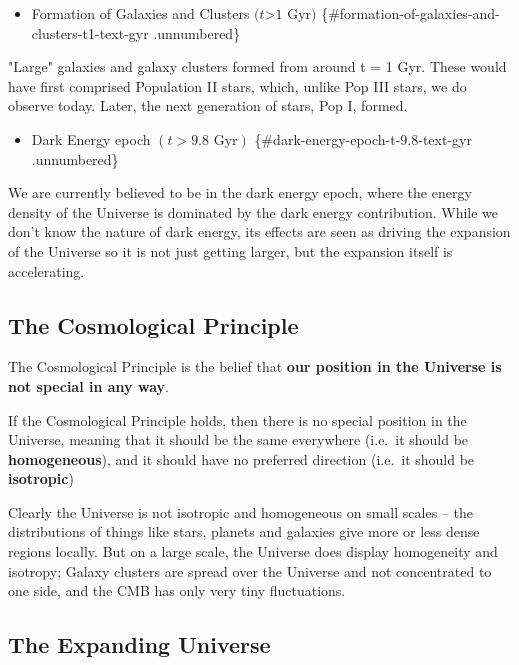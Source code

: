 \documentclass[11pt,a4paper,notoc]{tufte-handout}
\providecommand{\tightlist}{%
  \setlength{\itemsep}{0pt}\setlength{\parskip}{0pt}}
\begin{document}
\begin{itemize}
\tightlist
\item
  Formation of Galaxies and Clusters \((t\)\textgreater{}\(1 \text{ Gyr})\) \{\#formation-of-galaxies-and-clusters-t1-text-gyr .unnumbered\}
\end{itemize}

"Large" galaxies and galaxy clusters formed from around t = 1 Gyr.
These would have first comprised Population II stars, which, unlike Pop
III stars, we do observe today. Later, the next generation of stars, Pop
I, formed.

\begin{itemize}
\tightlist
\item
  Dark Energy epoch \((t > 9.8 \text{ Gyr})\) \{\#dark-energy-epoch-t-9.8-text-gyr .unnumbered\}
\end{itemize}

We are currently believed to be in the dark energy epoch, where the
energy density of the Universe is dominated by the dark energy
contribution. While we don't know the nature of dark energy, its effects
are seen as driving the expansion of the Universe so it is not just
getting larger, but the expansion itself is accelerating.

\hypertarget{sec:cosmoprinciple}{%
\subsection{The Cosmological Principle}\label{sec:cosmoprinciple}}

The Cosmological Principle is the belief that \textbf{our position in the
Universe is not special in any way}.

If the Cosmological Principle holds, then there is no special position
in the Universe, meaning that it should be the same everywhere (i.e.~it
should be \textbf{homogeneous}), and it should have no preferred direction
(i.e.~it should be \textbf{isotropic})

Clearly the Universe is not isotropic and homogeneous on small scales --
the distributions of things like stars, planets and galaxies give more
or less dense regions locally. But on a large scale, the Universe does
display homogeneity and isotropy; Galaxy clusters are spread over the
Universe and not concentrated to one side, and the CMB has only very
tiny fluctuations.

\hypertarget{sec:expanding_intro}{%
\subsection{The Expanding Universe}\label{sec:expanding_intro}}
\end{document}
